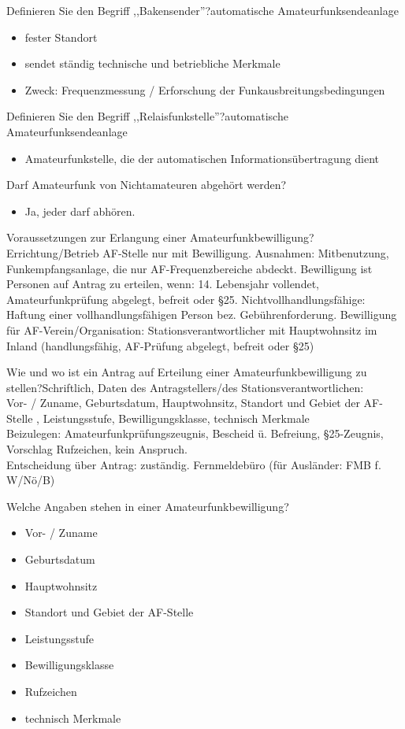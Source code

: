 \documentclass[avery5371,grid,frame,a4paper]{flashcards}
\newcommand{\card}[3]{
  \begin{flashcard}[{\chap} -- #1]{#2}#3\end{flashcard}
}
\begin{document}
\card{23}{Definieren Sie den Begriff ,,Bakensender''?}{automatische Amateurfunksendeanlage\begin{itemize}\itemsep1pt \item fester Standort \item sendet ständig technische und betriebliche Merkmale \item Zweck: Frequenzmessung / Erforschung der Funkausbreitungsbedingungen\end{itemize}}

\card{24}{Definieren Sie den Begriff ,,Relaisfunkstelle''?}{automatische Amateurfunksendeanlage\begin{itemize}\itemsep1pt \item Amateurfunkstelle, die der automatischen Informationsübertragung dient\end{itemize}}

\card{25}{ Darf Amateurfunk von Nichtamateuren abgehört werden?}{\begin{itemize}\itemsep1pt \item Ja, jeder darf abhören.\end{itemize}}

\card{26}{Voraussetzungen zur Erlangung einer Amateurfunkbewilligung?}{Errichtung/Betrieb AF-Stelle nur mit Bewilligung. Ausnahmen:  Mitbenutzung, Funkempfangsanlage, die nur AF-Frequenzbereiche abdeckt. Bewilligung ist Personen auf Antrag zu erteilen, wenn: 14. Lebensjahr vollendet, Amateurfunkprüfung abgelegt, befreit oder §25. Nichtvollhandlungsfähige: Haftung einer vollhandlungsfähigen Person bez. Gebührenforderung. Bewilligung für AF-Verein/Organisation: Stationsverantwortlicher mit Hauptwohnsitz im Inland (handlungsfähig, AF-Prüfung abgelegt, befreit oder §25)}

\card{27}{Wie und wo ist ein Antrag auf Erteilung einer Amateurfunkbewilligung zu stellen?}{Schriftlich, Daten des Antragstellers/des Stationsverantwortlichen:\\ Vor- / Zuname, Geburtsdatum, Hauptwohnsitz, Standort und Gebiet der AF-Stelle , Leistungsstufe, Bewilligungsklasse, technisch Merkmale \\ Beizulegen: Amateurfunkprüfungszeugnis, Bescheid ü. Befreiung, §25-Zeugnis, Vorschlag Rufzeichen, kein Anspruch. \\ Entscheidung über Antrag: zuständig. Fernmeldebüro (für Ausländer: FMB f. W/Nö/B)}

\card{28}{Welche Angaben stehen in einer Amateurfunkbewilligung?}{\begin{itemize}\itemsep0pt \item Vor- / Zuname \item Geburtsdatum \item Hauptwohnsitz \item Standort und Gebiet der AF-Stelle \item Leistungsstufe \item Bewilligungsklasse \item Rufzeichen \item technisch Merkmale\end{itemize}}
\end{document}

